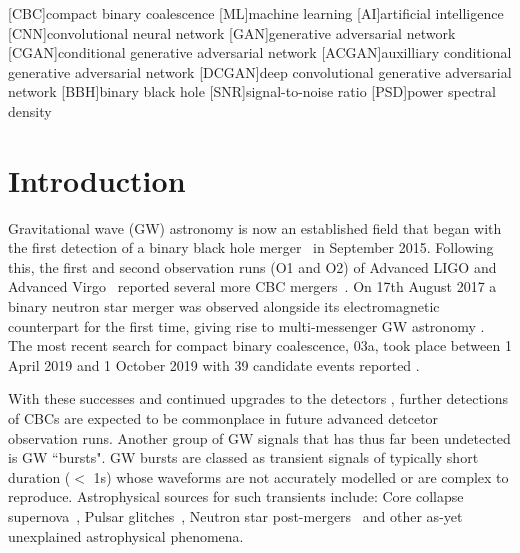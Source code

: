 \documentclass[12pt]{iopart}
\begin{document}
[CBC]{compact binary coalescence} 
[ML]{machine learning}
[AI]{artificial intelligence}
[CNN]{convolutional neural network}
[GAN]{generative adversarial network}
[CGAN]{conditional generative adversarial network}
[ACGAN]{auxilliary conditional generative adversarial network}
[DCGAN]{deep convolutional generative adversarial network}
[BBH]{binary black hole}
[SNR]{signal-to-noise ratio}
[PSD]{power spectral density}


\section{Introduction}


%
Gravitational wave (GW) astronomy is now an established field that began with the first detection of a binary black hole merger~\cite{Abbott2016} in September 2015. Following this, the first and second observation runs (O1 and O2) of Advanced LIGO and Advanced Virgo~\cite{Prospects-dets, AdvLIGO, AdvLIGO2, AdvVIRGO} reported several more \ac{CBC} mergers~\cite{Abbott2016a, Abbott2017, Abbott2017a}. On 17th August 2017 a binary neutron star merger was observed alongside its electromagnetic counterpart for the first time, giving rise to multi-messenger GW astronomy \cite{Abbott2017b}. The most recent search for compact binary coalescence, 03a, took place between 1 April 2019 and 1 October 2019 with 39 candidate events reported \cite{GWTC2:2020}.  

%
With these successes and continued upgrades to the detectors \cite{det-upgrades1,det-upgrades2}, further
detections of \acp{CBC} are expected to be commonplace in future advanced
detcetor observation runs. Another group of GW signals that has thus far
been undetected is GW ``bursts". GW bursts are classed as transient
signals of typically short duration ($<$ 1s) whose waveforms are not accurately
modelled or are complex to reproduce. Astrophysical sources for such transients
include: Core collapse supernova~\cite{Fryer_2003}, Pulsar
glitches~\cite{Andersson_2001}, Neutron star post-mergers~\cite{Baiotti_2007}
and other as-yet unexplained astrophysical phenomena. 
\end{document}
